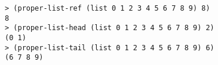 \begin{verbatim}
> (proper-list-ref (list 0 1 2 3 4 5 6 7 8 9) 8)
8
> (proper-list-head (list 0 1 2 3 4 5 6 7 8 9) 2)
(0 1)
> (proper-list-tail (list 0 1 2 3 4 5 6 7 8 9) 6)
(6 7 8 9)
\end{verbatim}